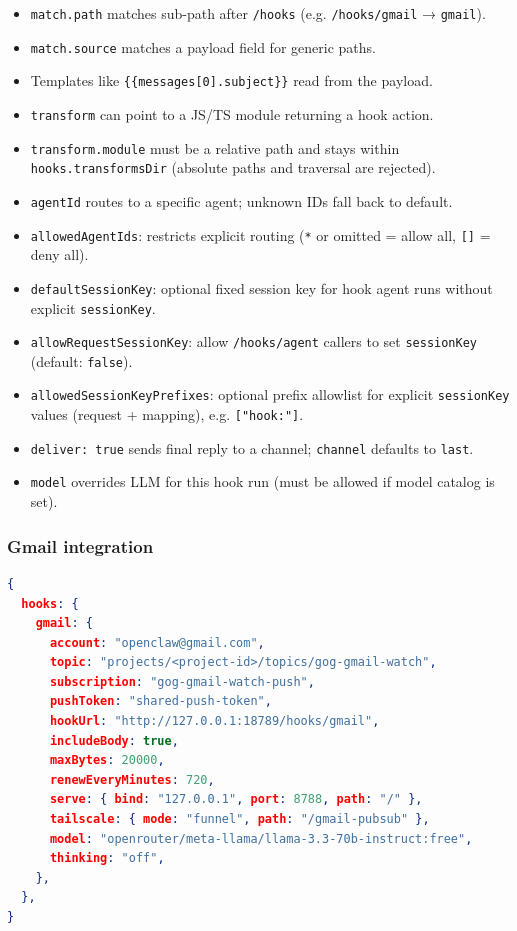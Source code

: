 \begin{itemize}
  \item \texttt{match.path} matches sub-path after \texttt{/hooks} (e.g. \texttt{/hooks/gmail} → \texttt{gmail}).
  \item \texttt{match.source} matches a payload field for generic paths.
  \item Templates like \texttt{\{\{messages[0].subject\}\}} read from the payload.
  \item \texttt{transform} can point to a JS/TS module returning a hook action.
  \item \texttt{transform.module} must be a relative path and stays within \texttt{hooks.transformsDir} (absolute paths and traversal are rejected).
  \item \texttt{agentId} routes to a specific agent; unknown IDs fall back to default.
  \item \texttt{allowedAgentIds}: restricts explicit routing (\texttt{*} or omitted = allow all, \texttt{[]} = deny all).
  \item \texttt{defaultSessionKey}: optional fixed session key for hook agent runs without explicit \texttt{sessionKey}.
  \item \texttt{allowRequestSessionKey}: allow \texttt{/hooks/agent} callers to set \texttt{sessionKey} (default: \texttt{false}).
  \item \texttt{allowedSessionKeyPrefixes}: optional prefix allowlist for explicit \texttt{sessionKey} values (request + mapping), e.g. \texttt{["hook:"]}.
  \item \texttt{deliver: true} sends final reply to a channel; \texttt{channel} defaults to \texttt{last}.
  \item \texttt{model} overrides LLM for this hook run (must be allowed if model catalog is set).
\end{itemize}



\subsubsection{Gmail integration}


\begin{lstlisting}[language=json]
{
  hooks: {
    gmail: {
      account: "openclaw@gmail.com",
      topic: "projects/<project-id>/topics/gog-gmail-watch",
      subscription: "gog-gmail-watch-push",
      pushToken: "shared-push-token",
      hookUrl: "http://127.0.0.1:18789/hooks/gmail",
      includeBody: true,
      maxBytes: 20000,
      renewEveryMinutes: 720,
      serve: { bind: "127.0.0.1", port: 8788, path: "/" },
      tailscale: { mode: "funnel", path: "/gmail-pubsub" },
      model: "openrouter/meta-llama/llama-3.3-70b-instruct:free",
      thinking: "off",
    },
  },
}
\end{lstlisting}


